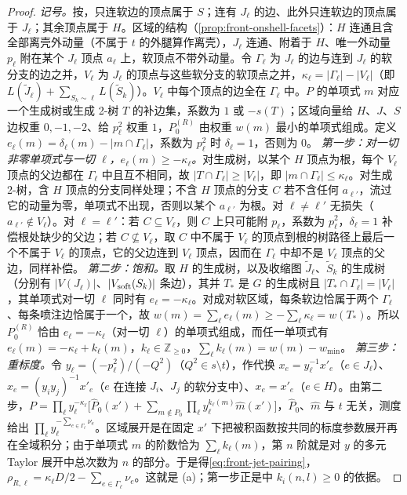 \begin{proof}
\emph{记号。}按\cite{Gardi:2022khw}，只连软边的顶点属于 $S$；连有 $J_\ell$ 的边、此外只连软边的顶点属于 $J_\ell$；其余顶点属于 $H$。区域的结构（\cref{prop:front-onshell-facets}）：$H$ 连通且含全部离壳外动量（不属于 $t$ 的外腿算作离壳），$J_\ell$ 连通、附着于 $H$、唯一外动量 $p_\ell$ 附在某个 $J_\ell$ 顶点 $a_\ell$ 上，软顶点不带外动量。令 $\Gamma_\ell$ 为 $J_\ell$ 的边与连到 $J_\ell$ 的软分支的边之并，$V_\ell$ 为 $J_\ell$ 的顶点与这些软分支的软顶点之并，$\kappa_\ell=|\Gamma_\ell|-|V_\ell|$（即 $L(\tilde J_\ell)+\sum_{S_k\sim\ell}L(\tilde S_k)$）。$V_\ell$ 中每个顶点的边全在 $\Gamma_\ell$ 中。$P$ 的单项式 $m$ 对应一个生成树或生成 2-树 $T$ 的补边集，系数为 $1$ 或 $-s(T)$；区域向量给 $H$、$J$、$S$ 边权重 $0,-1,-2$、给 $p_\ell^2$ 权重 $1$，$P^{(R)}_0$ 由权重 $w(m)$ 最小的单项式组成。定义 $e_\ell(m)=\delta_\ell(m)-|m\cap\Gamma_\ell|$，系数为 $p_\ell^2$ 时 $\delta_\ell=1$，否则为 $0$。
\emph{第一步：对一切非零单项式与一切 $\ell$，$e_\ell(m)\ge-\kappa_\ell$。}对生成树，以某个 $H$ 顶点为根，每个 $V_\ell$ 顶点的父边都在 $\Gamma_\ell$ 中且互不相同，故 $|T\cap\Gamma_\ell|\ge|V_\ell|$，即 $|m\cap\Gamma_\ell|\le\kappa_\ell$。对生成 2-树，含 $H$ 顶点的分支同样处理；不含 $H$ 顶点的分支 $C$ 若不含任何 $a_{\ell'}$，流过它的动量为零，单项式不出现，否则以某个 $a_{\ell'}$ 为根。对 $\ell\ne\ell'$ 无损失（$a_{\ell'}\notin V_\ell$）。对 $\ell=\ell'$：若 $C\subseteq V_\ell$，则 $C$ 上只可能附 $p_\ell$，系数为 $p_\ell^2$，$\delta_\ell=1$ 补偿根处缺少的父边；若 $C\not\subseteq V_\ell$，取 $C$ 中不属于 $V_\ell$ 的顶点到根的树路径上最后一个不属于 $V_\ell$ 的顶点，它的父边连到 $V_\ell$ 顶点，因而在 $\Gamma_\ell$ 中却不是 $V_\ell$ 顶点的父边，同样补偿。
\emph{第二步：饱和。}取 $H$ 的生成树，以及收缩图 $\tilde J_\ell$、$\tilde S_k$ 的生成树（分别有 $|V(J_\ell)|$、$|V_{\rm soft}(S_k)|$ 条边），其并 $T_*$ 是 $G$ 的生成树且 $|T_*\cap\Gamma_\ell|=|V_\ell|$，其单项式对一切 $\ell$ 同时有 $e_\ell=-\kappa_\ell$。对成对软区域，每条软边恰属于两个 $\Gamma_\ell$、每条喷注边恰属于一个，故 $w(m)=\sum_\ell e_\ell(m)\ge-\sum_\ell\kappa_\ell=w(T_*)$。所以 $P^{(R)}_0$ 恰由 $e_\ell=-\kappa_\ell$（对一切 $\ell$）的单项式组成，而任一单项式有 $e_\ell(m)=-\kappa_\ell+k_\ell(m)$，$k_\ell\in\mathbb Z_{\ge0}$，$\sum_\ell k_\ell(m)=w(m)-w_{\min}$。
\emph{第三步：重标度。}令 $y_\ell=(-p_\ell^2)/(-Q^2)$（$Q^2\in s\setminus t$），作代换 $x_e=y_\ell^{-1}x'_e$（$e\in J_\ell$）、$x_e=(y_iy_j)^{-1}x'_e$（$e$ 在连接 $J_i$、$J_j$ 的软分支中）、$x_e=x'_e$（$e\in H$）。由第二步，$P=\prod_\ell y_\ell^{-\kappa_\ell}\bigl[\hat P_0(x')+\sum_{m\notin P_0}\prod_\ell y_\ell^{k_\ell(m)}\hat m(x')\bigr]$，$\hat P_0$、$\hat m$ 与 $t$ 无关，测度给出 $\prod_\ell y_\ell^{-\sum_{e\in\Gamma_\ell}\nu_e}$。区域展开是在固定 $x'$ 下把被积函数按共同的标度参数展开再在全域积分；由于单项式 $m$ 的阶数恰为 $\sum_\ell k_\ell(m)$，第 $n$ 阶就是对 $y$ 的多元 Taylor 展开中总次数为 $n$ 的部分。于是得\cref{eq:front-jet-pairing}，$\rho_{R,\ell}=\kappa_\ell D/2-\sum_{e\in\Gamma_\ell}\nu_e$。这就是 (a)；第一步正是\cite[式~(5.20)]{Gardi:2022khw}中 $k_i(n,l)\ge0$ 的依据。

\end{proof}

